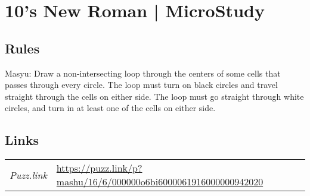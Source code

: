\section[10's New Roman | MicroStudy {[\emph{Masyu [6\emph{x}16]}]}]{10's New Roman | {\normalfont MicroStudy}}
\label{sec:06-10-s-new-roman-microstudy}

\subsection*{Rules}
\begin{markdown}
Masyu: Draw a non-intersecting loop through the centers of some cells that passes through every circle. The loop must turn on black circles and travel straight through the cells on either side. The loop must go straight through white circles, and turn in at least one of the cells on either side.
\end{markdown}
\subsection*{Links}
\begin{tabularx}{\textwidth}{l X}
\emph{Puzz.link} & \url{https://puzz.link/p?mashu/16/6/000000o6bi6000061916000000942020} \\
\end{tabularx}
\pagebreak
